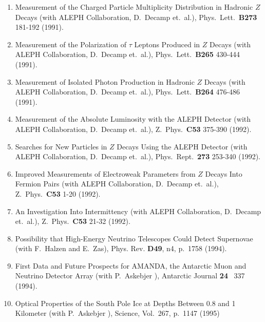 \begin{enumerate}
\item    Measurement of the Charged Particle Multiplicity Distribution
         in Hadronic $Z$ Decays
         (with ALEPH Collaboration, D.~Decamp et.~al.),
         Phys.~Lett.~{\bf B273} 181-192 (1991).

\item    Measurement of the Polarization of $\tau$ Leptons Produced
         in $Z$ Decays
         (with ALEPH Collaboration, D.~Decamp et.~al.),
         Phys.~Lett.~{\bf B265} 430-444 (1991).

\item    Measurement of Isolated Photon Production in Hadronic $Z$
         Decays
         (with ALEPH Collaboration, D.~Decamp et.~al.),
         Phys.~Lett.~{\bf B264} 476-486 (1991).

\item    Measurement of the Absolute Luminosity with the ALEPH Detector
         (with ALEPH Collaboration, D.~Decamp et.~al.),
         Z.~Phys.~{\bf C53} 375-390 (1992).

\item    Searches for New Particles in $Z$ Decays Using the ALEPH
         Detector
         (with ALEPH Collaboration, D.~Decamp et.~al.),
         Phys.~Rept.~{\bf 273} 253-340 (1992).

\item    Improved Measurements of Electroweak Parameters from $Z$
         Decays Into Fermion Pairs
         (with ALEPH Collaboration, D.~Decamp et.~al.),
         Z.~Phys.~{\bf C53} 1-20 (1992).

\item    An Investigation Into Intermittency
         (with ALEPH Collaboration, D.~Decamp et.~al.),
         Z.~Phys.~{\bf C53} 21-32 (1992).

\item    Possibility that High-Energy Neutrino Telescopes Could Detect
         Supernovae (with F.~Halzen and E.~Zas), Phys. Rev. {\bf D49},
         n4, p.~1758 (1994).

\item    First Data and Future Prospects for AMANDA, the Antarctic Muon and Neutrino 
         Detector Array (with P.~Askebjer \etal),  Antarctic Journal {\bf 24} \, 337
         (1994).

\item    Optical Properties of the South Pole Ice at Depths Between 0.8
         and 1 Kilometer (with P.~Askebjer \etal), Science, Vol.~267,
         p.~1147 (1995)


\end{enumerate}
